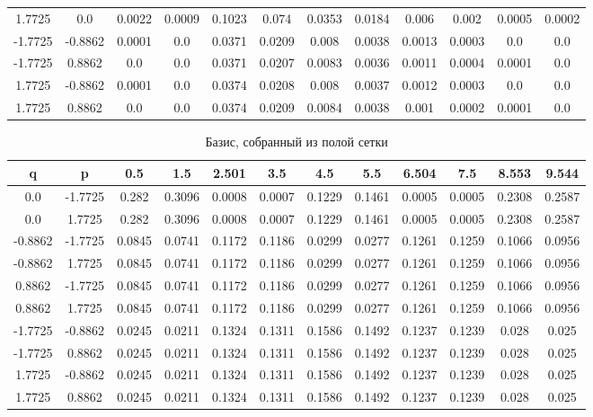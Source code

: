 \documentclass[a4paper,14pt]{extarticle}
\begin{document}
\begin{landscape}
\begin{table}[H]
\begin{tabular}{|c|c|*{10}{c}|}
1.7725  & 0.0     & 0.0022 & 0.0009 & 0.1023 & 0.074  & 0.0353 & 0.0184 & 0.006  & 0.002   & 0.0005  & 0.0002 \\  
-1.7725 & -0.8862 & 0.0001 & 0.0    & 0.0371 & 0.0209 & 0.008  & 0.0038 & 0.0013 & 0.0003  & 0.0     & 0.0    \\     
-1.7725 & 0.8862  & 0.0    & 0.0    & 0.0371 & 0.0207 & 0.0083 & 0.0036 & 0.0011 & 0.0004  & 0.0001  & 0.0    \\     
1.7725  & -0.8862 & 0.0001 & 0.0    & 0.0374 & 0.0208 & 0.008  & 0.0037 & 0.0012 & 0.0003  & 0.0     & 0.0    \\     
1.7725  & 0.8862  & 0.0    & 0.0    & 0.0374 & 0.0209 & 0.0084 & 0.0038 & 0.001  & 0.0002  & 0.0001  & 0.0    \\     
\hline
\end{tabular}
\end{table} 

\begin{table}[H]
\centering
\caption{Базис, собранный из полой сетки}
\begin{tabular}{|c|c|*{10}{c}|}
\hline
q       & p       & 0.5    & 1.5    & 2.501  & 3.5    & 4.5    & 5.5    & 6.504  & 7.5    & 8.553  & 9.544  \\ 
\hline                                                                                             
0.0     & -1.7725 & 0.282  & 0.3096 & 0.0008 & 0.0007 & 0.1229 & 0.1461 & 0.0005 & 0.0005 & 0.2308 & 0.2587 \\  
0.0     & 1.7725  & 0.282  & 0.3096 & 0.0008 & 0.0007 & 0.1229 & 0.1461 & 0.0005 & 0.0005 & 0.2308 & 0.2587 \\  
-0.8862 & -1.7725 & 0.0845 & 0.0741 & 0.1172 & 0.1186 & 0.0299 & 0.0277 & 0.1261 & 0.1259 & 0.1066 & 0.0956 \\  
-0.8862 & 1.7725  & 0.0845 & 0.0741 & 0.1172 & 0.1186 & 0.0299 & 0.0277 & 0.1261 & 0.1259 & 0.1066 & 0.0956 \\  
0.8862  & -1.7725 & 0.0845 & 0.0741 & 0.1172 & 0.1186 & 0.0299 & 0.0277 & 0.1261 & 0.1259 & 0.1066 & 0.0956 \\  
0.8862  & 1.7725  & 0.0845 & 0.0741 & 0.1172 & 0.1186 & 0.0299 & 0.0277 & 0.1261 & 0.1259 & 0.1066 & 0.0956 \\  
-1.7725 & -0.8862 & 0.0245 & 0.0211 & 0.1324 & 0.1311 & 0.1586 & 0.1492 & 0.1237 & 0.1239 & 0.028  & 0.025  \\  
-1.7725 & 0.8862  & 0.0245 & 0.0211 & 0.1324 & 0.1311 & 0.1586 & 0.1492 & 0.1237 & 0.1239 & 0.028  & 0.025  \\  
1.7725  & -0.8862 & 0.0245 & 0.0211 & 0.1324 & 0.1311 & 0.1586 & 0.1492 & 0.1237 & 0.1239 & 0.028  & 0.025  \\  
1.7725  & 0.8862  & 0.0245 & 0.0211 & 0.1324 & 0.1311 & 0.1586 & 0.1492 & 0.1237 & 0.1239 & 0.028  & 0.025  \\  
\hline
\end{tabular}
\end{table} 


\end{landscape}
\end{document}
